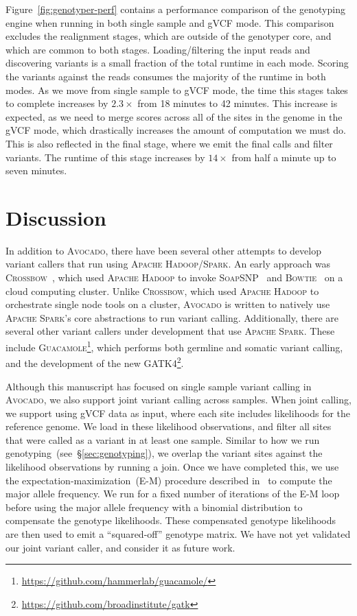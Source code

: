\documentclass{bioinfo}
\begin{document}
Figure~\ref{fig:genotyper-perf} contains a performance comparison of the
genotyping engine when running in both single sample and gVCF mode. This
comparison excludes the realignment stages, which are outside of the
genotyper core, and which are common to both stages. Loading/filtering the
input reads and discovering variants is a small fraction of the total runtime
in each mode. Scoring the variants against the reads consumes the majority of
the runtime in both modes. As we move from single sample to gVCF mode, the
time this stages takes to complete increases by $2.3\times$ from 18 minutes
to 42 minutes. This increase is expected, as we need to merge scores across
all of the sites in the genome in the gVCF mode, which drastically increases
the amount of computation we must do. This is also reflected in the final
stage, where we emit the final calls and filter variants. The runtime of this
stage increases by $14\times$ from half a minute up to seven minutes.

\section{Discussion}
\label{sec:discussion}

In addition to \textsc{Avocado}, there have been several other attempts to
develop variant callers that run using \textsc{Apache Hadoop/Spark}. An early
approach was \textsc{Crossbow}~\citep{langmead09crossbow}, which used
\textsc{Apache Hadoop} to invoke \textsc{SoapSNP}~\citep{li09snp} and
\textsc{Bowtie}~\citep{langmead09bowtie} on a cloud computing cluster.
Unlike \textsc{Crossbow}, which used \textsc{Apache Hadoop} to orchestrate
single node tools on a cluster, \textsc{Avocado} is written to natively use
\textsc{Apache Spark}'s core abstractions to run variant calling. Additionally,
there are several other variant callers under development that use
\textsc{Apache Spark}. These include
\textsc{Guacamole}\footnote{\url{https://github.com/hammerlab/guacamole/}},
which performs both germline and somatic variant calling, and the development
of the new \textsc{GATK4}\footnote{\url{https://github.com/broadinstitute/gatk}}.

Although this manuscript has focused on single sample variant calling in
\textsc{Avocado}, we also support joint variant calling across samples. When
joint calling, we support using gVCF data as input, where each site includes
likelihoods for the reference genome. We load in these likelihood observations,
and filter all sites that were called as a variant in at least one sample.
Similar to how we run genotyping~(see~\S\ref{sec:genotyping}), we overlap the
variant sites against the likelihood observations by running a join. Once we
have completed this, we use the expectation-maximization~(E-M) procedure
described in~\citet{li11} to compute the major allele frequency. We run for a
fixed number of iterations of the E-M loop before using the major allele
frequency with a binomial distribution to compensate the genotype
likelihoods. These compensated genotype likelihoods are then used to emit
a ``squared-off'' genotype matrix. We have not yet validated our joint variant
caller, and consider it as future work.
\end{document}
